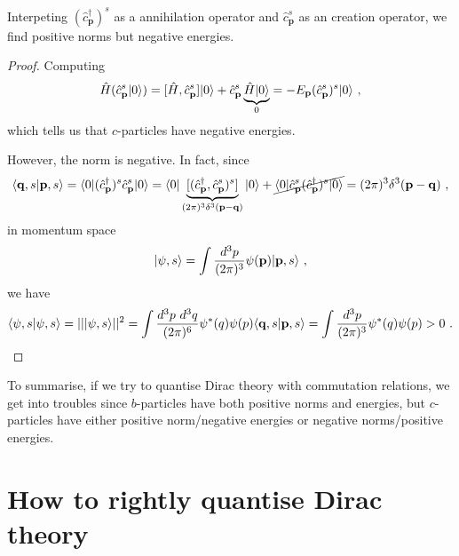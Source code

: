     Interpeting $(\hat c^\dagger_{\mathbf p})^s$ as a annihilation operator and $\hat c^s_{\mathbf p}$ as an creation operator, we find positive norms but negative energies. 
    \begin{proof}
        Computing 
        \begin{equation*}
            \hat H (\hat c^s_{\mathbf p} \vert0\rangle) = [\hat H, \hat c^s_{\mathbf p}] \vert0\rangle + \hat c^s_{\mathbf p} \underbrace{\hat H \vert0\rangle}_0 = - E_\mathbf p (\hat c^s_{\mathbf p})^s \vert0\rangle ~,
        \end{equation*}
        which tells us that $c$-particles have negative energies.

        However, the norm is negative. In fact, since
        \begin{equation*}
            \langle\mathbf q, s\vert\mathbf p, s\rangle = \langle0\vert (\hat c^\dagger_{\mathbf p})^s \hat c^s_{\mathbf p} \vert0\rangle = \langle0\vert \underbrace{[(\hat c^\dagger_{\mathbf p} , \hat c^s_{\mathbf p})^s]}_{(2\pi)^3 \delta^3 (\mathbf p - \mathbf q)} \vert0\rangle + \cancel{\langle0\vert \hat c^s_{\mathbf p} (\hat c^\dagger_{\mathbf p})^s \vert0\rangle} = (2\pi)^3 \delta^3 (\mathbf p - \mathbf q) ~,
        \end{equation*}
        in momentum space 
        \begin{equation*}
            \vert\psi, s\rangle = \int \frac{d^3 p}{(2\pi)^3} \psi (\mathbf p) \vert\mathbf p, s\rangle ~,
        \end{equation*}
        we have 
        \begin{equation*}
            \langle\psi, s\vert\psi, s\rangle = ||\vert\psi, s\rangle||^2 = \int \frac{d^3 p ~ d^3 q}{(2\pi)^6} \psi^* \mathbf(q) \psi \mathbf(p) \langle\mathbf q, s\vert\mathbf p, s\rangle = \int \frac{d^3 p}{(2\pi)^3} \psi^* \mathbf(q) \psi \mathbf(p) > 0 ~.
        \end{equation*}
    \end{proof}

    To summarise, if we try to quantise Dirac theory with commutation relations, we get into troubles since $b$-particles have both positive norms and energies, but $c$-particles have either positive norm/negative energies or negative norms/positive energies. 

\section{How to rightly quantise Dirac theory}

